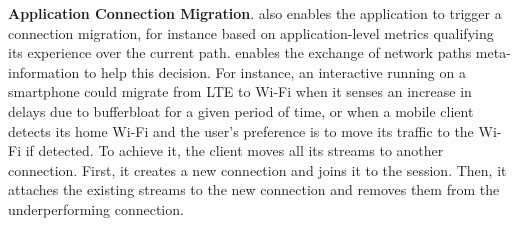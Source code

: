 \textbf{Application Connection Migration}. \tcpls also enables the
application to trigger a connection migration, for instance based on application-level metrics qualifying its experience over the current path.
\tcpls enables the exchange of network paths meta-information to help this
decision.
For instance, an interactive running on a smartphone could migrate from
LTE to Wi-Fi when it senses an increase in delays due to bufferbloat for a
given period of time, or when a mobile client detects its home Wi-Fi and the
user's preference is to move its traffic to the Wi-Fi if detected.
To achieve it, the client moves all its \tcpls streams to another \tcp
connection.
First, it creates a new \tcp connection and joins it to the
\tcpls
session. Then, %
it attaches the existing streams to the new
connection
and removes them from the underperforming connection.

